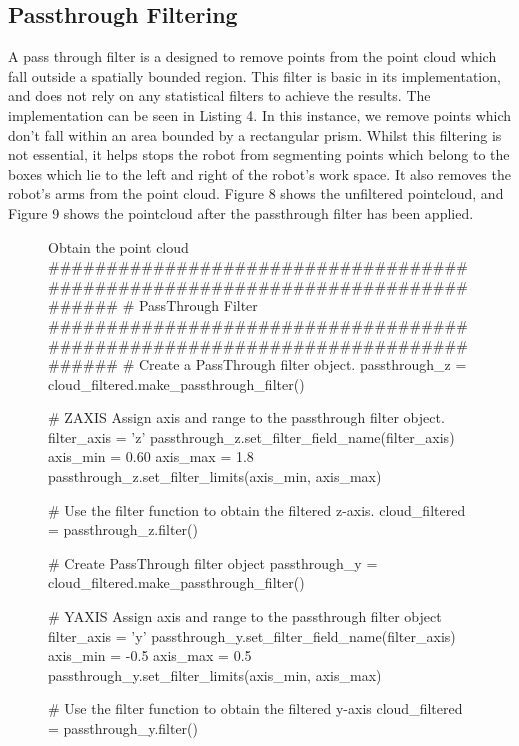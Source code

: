 \documentclass[a4paper]{article}
\begin{document}
\newpage

\subsection{Passthrough Filtering}
A pass through filter is a designed to remove points from the point cloud which fall outside a spatially bounded region. This filter is basic in its implementation, and does not rely on any statistical filters to achieve the results. The implementation can be seen in Listing 4. In this instance, we remove points which don't fall within an area bounded by a rectangular prism. Whilst this filtering is not essential, it helps stops the robot from segmenting points which belong to the boxes which lie to the left and right of the robot's work space. It also removes the robot's arms from the point cloud. Figure 8 shows the unfiltered pointcloud, and Figure 9 shows the pointcloud after the passthrough filter has been applied.

\vspace{1cm}

\begin{figure}[h]\scriptsize
\begin{sexylisting}{Obtain the point cloud}
##############################################################################
    # PassThrough Filter
##############################################################################
    # Create a PassThrough filter object.
    passthrough_z = cloud_filtered.make_passthrough_filter()

    # ZAXIS Assign axis and range to the passthrough filter object.
    filter_axis = 'z'
    passthrough_z.set_filter_field_name(filter_axis)
    axis_min = 0.60
    axis_max = 1.8
    passthrough_z.set_filter_limits(axis_min, axis_max)

    # Use the filter function to obtain the filtered z-axis.
    cloud_filtered = passthrough_z.filter()

    # Create PassThrough filter object
    passthrough_y = cloud_filtered.make_passthrough_filter()

    # YAXIS Assign axis and range to the passthrough filter object
    filter_axis = 'y'
    passthrough_y.set_filter_field_name(filter_axis)
    axis_min = -0.5
    axis_max = 0.5
    passthrough_y.set_filter_limits(axis_min, axis_max)

    # Use the filter function to obtain the filtered y-axis
    cloud_filtered = passthrough_y.filter()
\end{sexylisting}
\end{figure}
\end{document}
